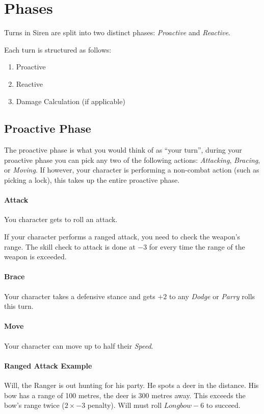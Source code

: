 \section{Phases}\label{sec:phases}
Turns in Siren are split into two distinct phases: \textit{Proactive} and \textit{Reactive}.

Each turn is structured as follows:
\begin{enumerate}
  \item Proactive 
  \item Reactive
  \item Damage Calculation (if applicable)
\end{enumerate}

\subsection{Proactive Phase}
The proactive phase is what you would think of as ``your turn'', during your proactive phase you can pick any two of the following actions: \textit{Attacking}, \textit{Bracing}, or \textit{Moving}.
If however, your character is performing a non-combat action (such as picking a lock), this takes up the entire proactive phase.

\paragraph{Attack}
You character gets to roll an attack.

If your character performs a ranged attack, you need to check the weapon's range.
The skill check to attack is done at $-3$ for every time the range of the weapon is exceeded.

\paragraph{Brace}
Your character takes a defensive stance and gets $+2$ to any \textit{Dodge} or \textit{Parry} rolls this turn.

\paragraph{Move}
Your character can move up to half their \textit{Speed}.

\paragraph{Ranged Attack Example} Will, the Ranger is out hunting for his party. 
He spots a deer in the distance. 
His bow has a range of 100 metres, the deer is 300 metres away. 
This exceeds the bow's range twice ($2\times -3$ penalty). 
Will must roll $Longbow-6$ to succeed.

